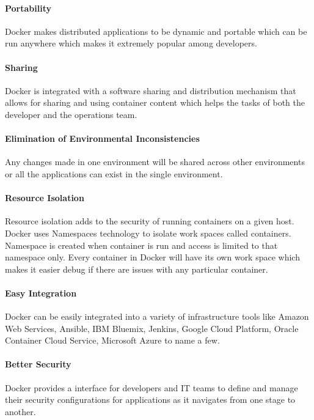 	\paragraph{Portability}
	Docker makes distributed applications to be dynamic and 
  portable which can be run anywhere which makes it extremely
  popular among developers.
  
	\paragraph{Sharing}
	Docker is integrated with a software sharing and distribution
  mechanism that allows for sharing and using container content 
  which helps the tasks of both the developer and the operations
  team.
  
	\paragraph{Elimination of Environmental Inconsistencies}
	Any changes made in one environment will be shared across other
  environments or all the applications can exist in the single 
  environment.
  
	\paragraph{Resource Isolation}
	Resource isolation adds to the security of running containers
  on a given host. Docker uses Namespaces technology to isolate 
  work spaces called containers. Namespace is created when container
  is run and access is limited to that namespace only. Every 
  container in Docker will have its own work space which makes
  it easier debug if there are issues with any particular
  container.
  
	\paragraph{Easy Integration}
	Docker can be easily integrated into a variety of infrastructure 
  tools like Amazon Web Services, Ansible, IBM Bluemix, Jenkins, 
  Google Cloud Platform, Oracle Container Cloud Service, 
  Microsoft Azure to name a few.
  
	\paragraph{Better Security}
	Docker provides a interface for developers and IT teams to define 
  and manage their security configurations for applications as it
  navigates from one stage to another.
	
